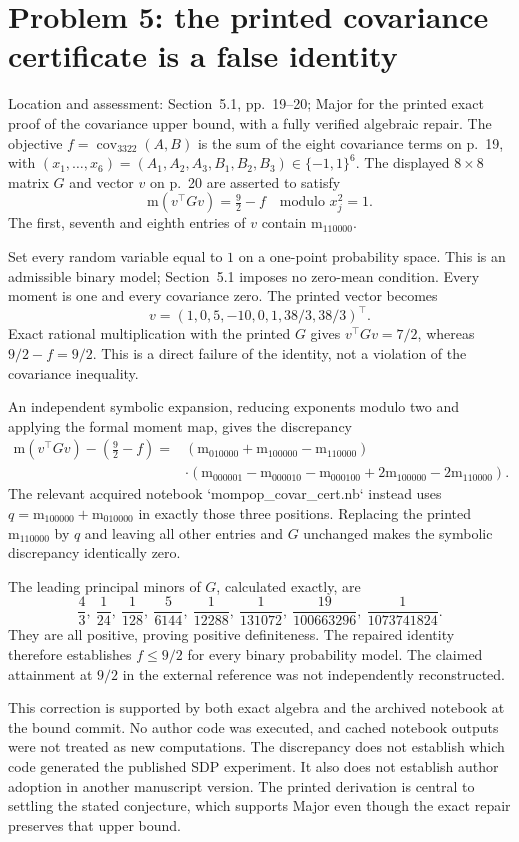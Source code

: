 \documentclass[10pt]{article}
\begin{document}
\section*{Problem 5: the printed covariance certificate is a false identity}
Location and assessment: Section 5.1, pp. 19–20; Major for the printed exact proof of the covariance upper bound, with a fully verified algebraic repair. The objective \(f=\operatorname{cov}_{3322}(A,B)\) is the sum of the eight covariance terms on p. 19, with \((x_1,\ldots,x_6)=(A_1,A_2,A_3,B_1,B_2,B_3)\in\{-1,1\}^6\). The displayed \(8\times8\) matrix \(G\) and vector \(v\) on p. 20 are asserted to satisfy \[\mathrm{m}(v^\top Gv)=\tfrac92-f
 \quad\text{modulo }x_j^2=1.\] The first, seventh and eighth entries of \(v\) contain \(\mathrm{m}_{110000}\).\par
Set every random variable equal to \(1\) on a one-point probability space. This is an admissible binary model; Section 5.1 imposes no zero-mean condition. Every moment is one and every covariance zero. The printed vector becomes \[v=(1,0,5,-10,0,1,38/3,38/3)^\top .\] Exact rational multiplication with the printed \(G\) gives \(v^\top Gv=7/2\), whereas \(9/2-f=9/2\). This is a direct failure of the identity, not a violation of the covariance inequality.\par
An independent symbolic expansion, reducing exponents modulo two and applying the formal moment map, gives the discrepancy \[\begin{aligned}
 \mathrm{m}(v^\top Gv)-(\tfrac92-f)
 ={}&(\mathrm{m}_{010000}+\mathrm{m}_{100000}-\mathrm{m}_{110000}) \nonumber\\
 &\cdot(\mathrm{m}_{000001}-\mathrm{m}_{000010}-\mathrm{m}_{000100}
             +2\mathrm{m}_{100000}-2\mathrm{m}_{110000}).\end{aligned}\] The relevant acquired notebook `mompop\_covar\_cert.nb` instead uses \(q=\mathrm{m}_{100000}+\mathrm{m}_{010000}\) in exactly those three positions. Replacing the printed \(\mathrm{m}_{110000}\) by \(q\) and leaving all other entries and \(G\) unchanged makes the symbolic discrepancy identically zero.\par
The leading principal minors of \(G\), calculated exactly, are \[\frac43,\ \frac1{24},\ \frac1{128},\ \frac5{6144},\
 \frac1{12288},\ \frac1{131072},\
 \frac{19}{100663296},\ \frac1{1073741824}.\] They are all positive, proving positive definiteness. The repaired identity therefore establishes \(f\le9/2\) for every binary probability model. The claimed attainment at \(9/2\) in the external reference was not independently reconstructed.\par
This correction is supported by both exact algebra and the archived notebook at the bound commit. No author code was executed, and cached notebook outputs were not treated as new computations. The discrepancy does not establish which code generated the published SDP experiment. It also does not establish author adoption in another manuscript version. The printed derivation is central to settling the stated conjecture, which supports Major even though the exact repair preserves that upper bound.\par
\end{document}
